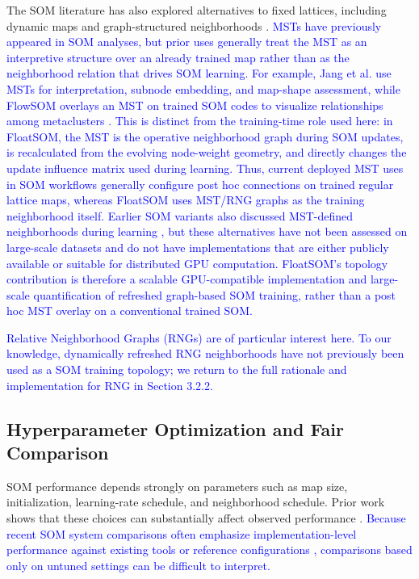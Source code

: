 \documentclass[10pt]{article} %
\newcommand{\TrackedChange}[1]{\textcolor{blue}{#1}}
\begin{document}
The SOM literature has also explored alternatives to fixed lattices, including dynamic maps and graph-structured neighborhoods \citep{vasighiDirectedBatchGrowing2017,spanakisAMSOMAdaptiveMoving2016,kangasVariantsSelforganizingMaps1990,jangUseMinimalSpanning2009}. \TrackedChange{MSTs have previously appeared in SOM analyses, but prior uses generally treat the MST as an interpretive structure over an already trained map rather than as the neighborhood relation that drives SOM learning.} \TrackedChange{For example, Jang et al. use MSTs for interpretation, subnode embedding, and map-shape assessment, while FlowSOM overlays an MST on trained SOM codes to visualize relationships among metaclusters \citep{jangUseMinimalSpanning2009,vangassenFlowSOMUsingSelforganizing2015}.} \TrackedChange{This is distinct from the training-time role used here: in FloatSOM, the MST is the operative neighborhood graph during SOM updates, is recalculated from the evolving node-weight geometry, and directly changes the update influence matrix used during learning.} \TrackedChange{Thus, current deployed MST uses in SOM workflows generally configure post hoc connections on trained regular lattice maps, whereas FloatSOM uses MST/RNG graphs as the training neighborhood itself.} \TrackedChange{Earlier SOM variants also discussed MST-defined neighborhoods during learning \citep{kangasVariantsSelforganizingMaps1990}, but these alternatives have not been assessed on large-scale datasets and do not have implementations that are either publicly available or suitable for distributed GPU computation.} \TrackedChange{FloatSOM's topology contribution is therefore a scalable GPU-compatible implementation and large-scale quantification of refreshed graph-based SOM training, rather than a post hoc MST overlay on a conventional trained SOM.}

\TrackedChange{Relative Neighborhood Graphs (RNGs) \citep{toussaintRelativeNeighbourhoodGraph1980} are of particular interest here.} \TrackedChange{To our knowledge, dynamically refreshed RNG neighborhoods have not previously been used as a SOM training topology; we return to the full rationale and implementation for RNG in Section 3.2.2.}

\subsection{Hyperparameter Optimization and Fair Comparison}

SOM performance depends strongly on parameters such as map size, initialization, learning-rate schedule, and neighborhood schedule. Prior work shows that these choices can substantially affect observed performance \citep{akindukoSOMStochasticInitialization2016,forestSurveyImplementationPerformance2020}. \TrackedChange{Because recent SOM system comparisons often emphasize implementation-level performance against existing tools or reference configurations \citep{manciniXPySomHighPerformanceSelfOrganizing2020,kratochvilGigaSOMjlHighperformanceClustering2020}, comparisons based only on untuned settings can be difficult to interpret.}
\end{document}
